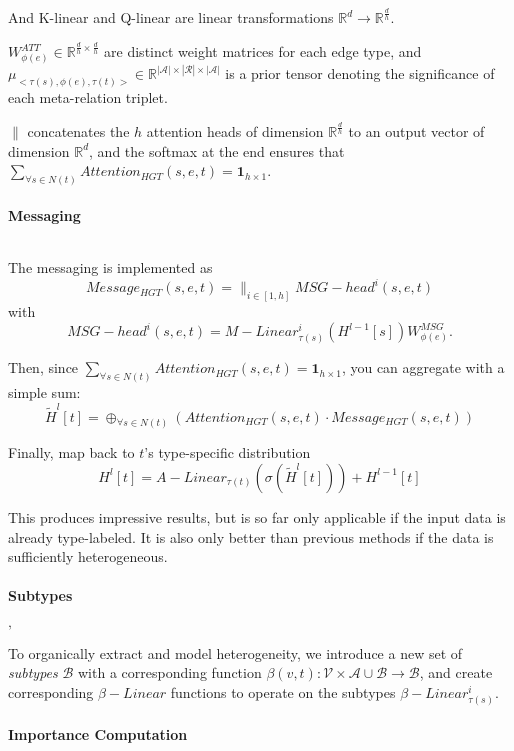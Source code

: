 And K-linear and Q-linear are linear transformations \(\mathbb{R}^d \rightarrow \mathbb{R}^{\frac{d}{h}}\).

\(W^{ATT}_{\phi(e)} \in \mathbb{R}^{\frac{d}{h} \times \frac{d}{h}}\) are distinct weight matrices for each edge type, and
\(\mu_{<\tau(s), \phi(e), \tau(t)>} \in \mathbb{R}^{|\mathcal{A}| \times |\mathcal{R}| \times |\mathcal{A}|}\) is a prior tensor denoting the significance of each meta-relation triplet.

\(\|\) concatenates the \(h\) attention heads of dimension \(\mathbb{R}^{\frac{d}{h}}\) to an output vector of dimension \(\mathbb{R}^{d}\), and
the softmax at the end ensures that \(\sum_{\forall s \in N(t)} Attention_{HGT} (s, e, t) = \mathbf{1}_{h \times 1}\).


\paragraph{Messaging}$\,$

The messaging is implemented as
\[ Message_{HGT} (s, e, t) = \|_{i \in [1, h]} MSG-head^i (s, e, t) \]
with
\[ MSG-head^i (s,e,t) = M-Linear^{i}_{\tau(s)} (H^{l-1}[s])W^{MSG}_{\phi(e)}. \]

Then, since  \(\sum_{\forall s \in N(t)} Attention_{HGT} (s, e, t) = \mathbf{1}_{h \times 1}\), you can aggregate with
a simple sum:
\[ \tilde{H}^l [t] = \oplus_{\forall s \in N(t)} ( Attention_{HGT} (s, e, t) \cdot Message_{HGT} (s, e, t)) \]

Finally, map back to \(t\)'s type-specific distribution
\[ H^l [t] = A-Linear_{\tau(t)} (\sigma (\tilde{H}^l [t] )) + H^{l-1} [t] \]

This produces impressive results, but is so far only applicable if the input data is already type-labeled. It is also only
better than previous methods if the data is sufficiently heterogeneous.

\paragraph{Subtypes}$,$

To organically extract and model heterogeneity, we introduce a new set of \emph{subtypes} \(\mathcal{B}\) with a corresponding function
\(\beta(v,t) : \mathcal{V} \times \mathcal{A} \cup \mathcal{B} \rightarrow \mathcal{B}\), and create corresponding \(\beta-Linear\) functions to operate on the subtypes \(\beta-Linear^{i}_{\tau(s)}\).

\paragraph{Importance Computation}$\,$

